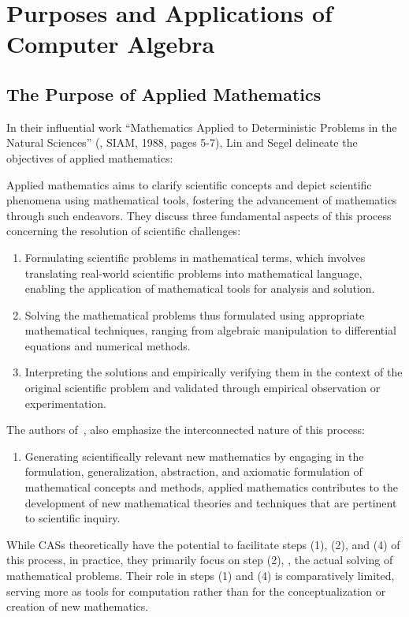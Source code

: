 
\section{Purposes and Applications of Computer Algebra}

\subsection{The Purpose of Applied Mathematics}

In their influential work ``{Mathematics Applied to Deterministic Problems in the Natural Sciences}'' (\cite{li1998making}, SIAM, 1988, pages 5-7), Lin and Segel delineate the objectives of applied mathematics:

Applied mathematics aims to clarify scientific concepts and depict scientific phenomena using mathematical tools, fostering the advancement of mathematics through such endeavors. They discuss three fundamental aspects of this process concerning the resolution of scientific challenges:
%
\begin{enumerate}
  \setlength{\itemsep}{0.0em}
  \item Formulating scientific problems in mathematical terms, which involves translating real-world scientific problems into mathematical language, enabling the application of mathematical tools for analysis and solution.
  \item Solving the mathematical problems thus formulated using appropriate mathematical techniques, ranging from algebraic manipulation to differential equations and numerical methods.
  \item Interpreting the solutions and empirically verifying them in the context of the original scientific problem and validated through empirical observation or experimentation.
\end{enumerate}
%
The authors of~\cite{li1998making}, also emphasize the interconnected nature of this process:
%
\begin{enumerate}
  \setlength{\itemsep}{0.0em}
  \item Generating scientifically relevant new mathematics by engaging in the formulation, generalization, abstraction, and axiomatic formulation of mathematical concepts and methods, applied mathematics contributes to the development of new mathematical theories and techniques that are pertinent to scientific inquiry.
\end{enumerate}
%
While \acp{CAS} theoretically have the potential to facilitate steps (1), (2), and (4) of this process, in practice, they primarily focus on step (2), \ie{}, the actual solving of mathematical problems. Their role in steps (1) and (4) is comparatively limited, serving more as tools for computation rather than for the conceptualization or creation of new mathematics.


